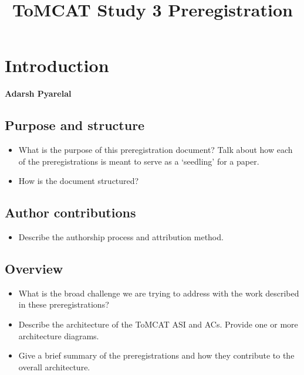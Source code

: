 \documentclass[oneside,9pt]{memoir}
\title{ToMCAT Study 3 Preregistration}
\date{}
\begin{document}
\maketitle
\tableofcontents* 

\chapter{Introduction}
\textbf{Adarsh Pyarelal}

\section{Purpose and structure}
\begin{itemize}
    \item What is the purpose of this preregistration document? Talk about how
        each of the preregistrations is meant to serve as a `seedling' for a
        paper.
    \item How is the document structured?
\end{itemize}

\section{Author contributions}
\begin{itemize}
    \item Describe the authorship process and attribution method.
\end{itemize}

\section{Overview}
\begin{itemize}
    \item What is the broad challenge we are trying to address with the work
        described in these preregistrations?
    \item Describe the architecture of the ToMCAT ASI and ACs. Provide one or
        more architecture diagrams.
    \item Give a brief summary of the preregistrations and how they contribute
        to the overall architecture.
\end{itemize}








\printbibliography
\end{document}
